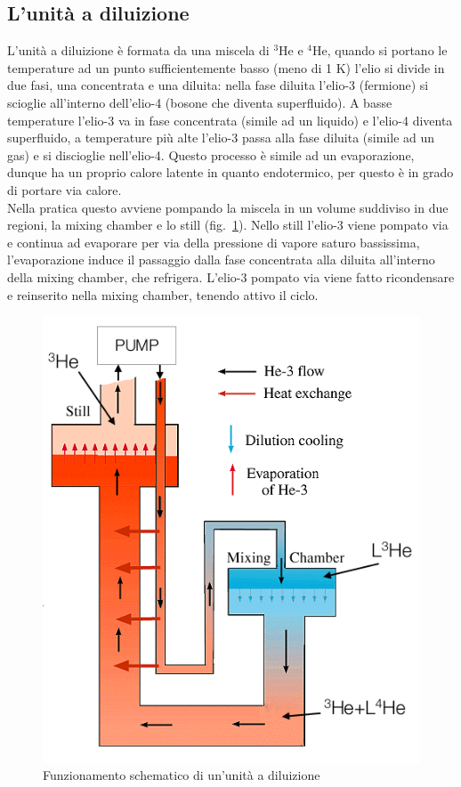 \subsection{L'unit\`a a diluizione}
L'unit\`a a diluizione \`e formata da una miscela di $^3\text{He}$ e $^4$He, quando si portano le temperature ad un punto sufficientemente basso (meno di 1 K)
l'elio si divide in due fasi, una concentrata e una diluita: nella fase diluita l'elio-3 (fermione) si scioglie all'interno dell'elio-4 (bosone che diventa superfluido).
A basse temperature l'elio-3 va in fase concentrata (simile ad un liquido) e l'elio-4 diventa superfluido, a temperature pi\`u alte l'elio-3 passa
alla fase diluita (simile ad un gas) e si discioglie nell'elio-4.
Questo processo \`e simile ad un evaporazione, dunque ha un proprio calore latente in quanto endotermico, per questo \`e in grado di portare via calore.\\
Nella pratica questo avviene pompando la miscela in un volume suddiviso in due regioni, la mixing chamber e lo still (fig.~\ref{fig:unitaDiluizione}).
Nello still l'elio-3 viene pompato via e continua ad evaporare per via della pressione di vapore saturo bassissima, l'evaporazione
induce il passaggio dalla fase concentrata alla diluita all'interno della mixing chamber, che refrigera.
L'elio-3 pompato via viene fatto ricondensare e reinserito nella mixing chamber, tenendo attivo il ciclo.
\begin{figure}[htbp]
\begin{center}
\includegraphics[scale=0.50]{./Immagini/UnitaDiluizione.png}
\caption{Funzionamento schematico di un'unit\`a a diluizione}
\label{fig:unitaDiluizione}
\end{center}
\end{figure}
